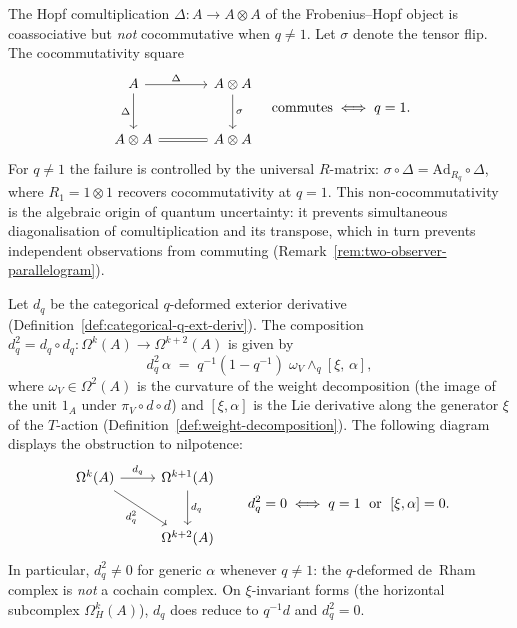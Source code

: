 \begin{remark}
\label{rem:hopf-non-cocommutativity}
The Hopf comultiplication $\Delta \colon A \to A \otimes A$ of the
Frobenius--Hopf object is coassociative but \emph{not} cocommutative
when $q \neq 1$.  Let $\sigma$ denote the tensor flip.  The
cocommutativity square
\begin{equation}\label{eq:non-cocommutativity}
\begin{tikzcd}[row sep=2.5em, column sep=3.5em]
  A
    \ar[r, "\Delta"]
    \ar[d, "\Delta"']
  & A \otimes A
    \ar[d, "\sigma"]
  \\
  A \otimes A
    \ar[r, equal]
  & A \otimes A
\end{tikzcd}
\quad\text{commutes}\;\Longleftrightarrow\;q = 1.
\end{equation}
For $q \neq 1$ the failure is controlled by the universal $R$-matrix:
$\sigma \circ \Delta = \mathrm{Ad}_{R_q} \circ \Delta$,
where $R_1 = 1 \otimes 1$ recovers cocommutativity at $q = 1$.
This non-cocommutativity is the algebraic origin of quantum
uncertainty: it prevents simultaneous diagonalisation of comultiplication
and its transpose, which in turn prevents independent observations from
commuting (Remark~\ref{rem:two-observer-parallelogram}).
\end{remark}


\begin{proposition}
\label{prop:categorical-dq-squared}
\leanok
Let $d_q$ be the categorical $q$-deformed exterior derivative
(Definition~\ref{def:categorical-q-ext-deriv}).  The composition
$d_q^2 = d_q \circ d_q \colon \Omega^k(A) \to \Omega^{k+2}(A)$ is
given by
\[
  d_q^2\,\alpha
  \;=\; q^{-1}(1 - q^{-1})\;\omega_V \wedge_q [\xi,\, \alpha],
\]
where $\omega_V \in \Omega^2(A)$ is the curvature of the weight
decomposition (the image of the unit $1_A$ under
$\pi_V \circ d \circ d$) and $[\xi, \alpha]$ is the Lie derivative
along the generator $\xi$ of the $T$-action
(Definition~\ref{def:weight-decomposition}).  The following diagram
displays the obstruction to nilpotence:
\begin{equation}\label{eq:dq-squared-cd}
\begin{tikzcd}[row sep=2.5em, column sep=2.5em]
  \Omega^k(A) \ar[r, "d_q"] \ar[dr, "d_q^2"']
  & \Omega^{k+1}(A) \ar[d, "d_q"] \\
  & \Omega^{k+2}(A)
\end{tikzcd}
\qquad
d_q^2 = 0 \;\Longleftrightarrow\;
q = 1 \;\text{ or }\; [\xi, \alpha] = 0.
\end{equation}
In particular, $d_q^2 \neq 0$ for generic $\alpha$ whenever
$q \neq 1$: the $q$-deformed de~Rham complex is \emph{not} a cochain
complex.  On $\xi$-invariant forms (the horizontal subcomplex
$\Omega^k_H(A)$), $d_q$ does reduce to $q^{-1} d$ and $d_q^2 = 0$.
\end{proposition}


